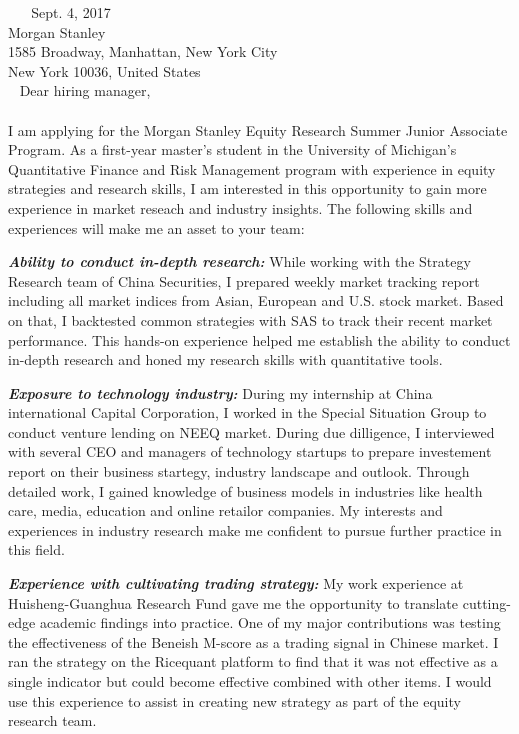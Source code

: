 \documentclass{coverletter} %
\begin{document}
\begin{rSection}{}
\ \newline
\ \newline
Sept. 4, 2017\\
Morgan Stanley\\
1585 Broadway, Manhattan, New York City\\ 
New York 10036, United States\\
\ \newline
Dear hiring manager, \\
\\
I am applying for the Morgan Stanley Equity Research Summer Junior Associate Program. As a first-year master’s student in the University of Michigan’s Quantitative Finance and Risk Management program with experience in equity strategies and research skills, I am interested in this opportunity to gain more experience in market reseach and industry insights. The following skills and experiences will make me an asset to your team:
\begin{rSubsection}{}{}{}{}
\item {\bf \em Ability to conduct in-depth research:} While working with the Strategy Research team of China Securities, I prepared weekly market tracking report including all market indices from Asian, European and U.S. stock market. Based on that, I backtested common strategies with SAS to track their recent market performance. This hands-on experience helped me establish the ability to conduct in-depth research and honed my research skills with quantitative tools.
\item {\bf \em Exposure to technology industry:} During my internship at China international Capital Corporation, I worked in the Special Situation Group to conduct venture lending on NEEQ market. During due dilligence, I interviewed with several CEO and managers of technology startups to prepare investement report on their business startegy, industry landscape and outlook. Through detailed work, I gained knowledge of business models in industries like health care, media, education and online retailor companies. My interests and experiences in industry research make me confident to pursue further practice in this field.
\item {\bf \em Experience with cultivating trading strategy:} My work experience at Huisheng-Guanghua Research Fund gave me the opportunity to translate cutting-edge academic findings into practice. One of my major contributions was testing the effectiveness of the Beneish M-score as a trading signal in Chinese market. I ran the strategy on the Ricequant platform to find that it was not effective as a single indicator but could become effective combined with other items. I would use this experience to assist in creating new strategy as part of the equity research team.


\end{rSubsection}
\end{rSection}
\end{document}
